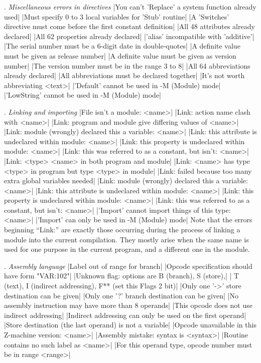 \medskip{}. {\sl Miscellaneous errors in directives}
\beginlines
|You can't 'Replace' a system function already used|
|Must specify 0 to 3 local variables for 'Stub' routine|
|A 'Switches' directive must come before the first constant definition|
|All 48 attributes already declared|
|All 62 properties already declared|
|'alias' incompatible with 'additive'|
|The serial number must be a 6-digit date in double-quotes|
|A definite value must be given as release number|
|A definite value must be given as version number|
|The version number must be in the range 3 to 8|
|All 64 abbreviations already declared|
|All abbreviations must be declared together|
|It's not worth abbreviating <text>|
|'Default' cannot be used in -M (Module) mode|
|'LowString' cannot be used in -M (Module) mode|
\endlines

\medskip{}. {\sl Linking and importing}
\beginlines
|File isn't a module: <name>|
|Link: action name clash with <name>|
|Link: program and module give differing values of <name>|
|Link: module (wrongly) declared this a variable: <name>|
|Link: this attribute is undeclared within module: <name>|
|Link: this property is undeclared within module: <name>|
|Link: this was referred to as a constant, but isn't: <name>|
|Link: <type> <name> in both program and module|
|Link: <name> has type <type> in program but type <type> in module|
|Link: failed because too many extra global variables needed|
|Link: module (wrongly) declared this a variable: <name>|
|Link: this attribute is undeclared within module: <name>|
|Link: this property is undeclared within module: <name>|
|Link: this was referred to as a constant, but isn't: <name>|
|'Import' cannot import things of this type: <name>|
|'Import' can only be used in -M (Module) mode|
\endlines
Note that the errors beginning ``Link:'' are exactly those occurring
during the process of linking a module into the current compilation.
They mostly arise when the same name is used for one purpose in the
current program, and a different one in the module.

\medskip{}. {\sl Assembly language}
\beginlines
|Label out of range for branch|
|Opcode specification should have form "VAR:102"|
|Unknown flag: options are B (branch), S (store),|
|    T (text), I (indirect addressing), F** (set this Flags 2 bit)|
|Only one '->' store destination can be given|
|Only one '?' branch destination can be given|
|No assembly instruction may have more than 8 operands|
|This opcode does not use indirect addressing|
|Indirect addressing can only be used on the first operand|
|Store destination (the last operand) is not a variable|
|Opcode unavailable in this Z-machine version: <name>|
|Assembly mistake: syntax is <syntax>|
|Routine contains no such label as <name>|
|For this operand type, opcode number must be in range <range>|
\endlines

